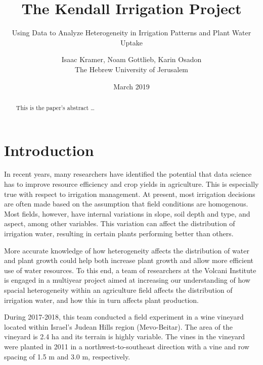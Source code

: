 \documentclass[12pt]{scrartcl}
\begin{document}
\title{The Kendall Irrigation Project}
\subtitle{Using Data to Analyze Heterogeneity in Irrigation Patterns and Plant Water Uptake}
\author{Isaac Kramer, Noam Gottlieb, Karin Osadon \\
        The Hebrew University of Jerusalem}
\date{March 2019}
\subject{Needle in a Data Haystack\\
Introduction to Data Science (67978) \\}


    \pagestyle{myheadings}


\begin{titlepage}
		\maketitle

    \begin{abstract}
    This is the paper's abstract \ldots
    \end{abstract}
\end{titlepage}


\doublespacing
\section{Introduction}
In recent years, many researchers have identified the potential that data science has to improve resource efficiency and crop yields in agriculture. This is especially true with respect to irrigation management. At present, most irrigation decisions are often made based on the assumption that field conditions are homogenous. Most fields, however, have internal variations in slope, soil depth and type, and aspect, among other variables. This variation can affect the distribution of irrigation water, resulting in certain plants performing better than others.

More accurate knowledge of how heterogeneity affects the distribution of water and plant growth could help both increase plant growth and allow more efficient use of water resources. To this end, a team of researchers at the Volcani Institute is engaged in a multiyear project aimed at increasing our understanding of how spacial heterogeneity within an agriculture field affects the distribution of irrigation water, and how this in turn affects plant production.

During 2017-2018, this team conducted a field experiment in a wine vineyard located within Israel's Judean Hills region (Mevo-Beitar). The area of the vineyard is 2.4 ha and its terrain is highly variable. The vines in the vineyard were planted in 2011 in a northwest-to-southeast direction with a vine and row spacing of 1.5 m and 3.0 m, respectively.
\end{document}
